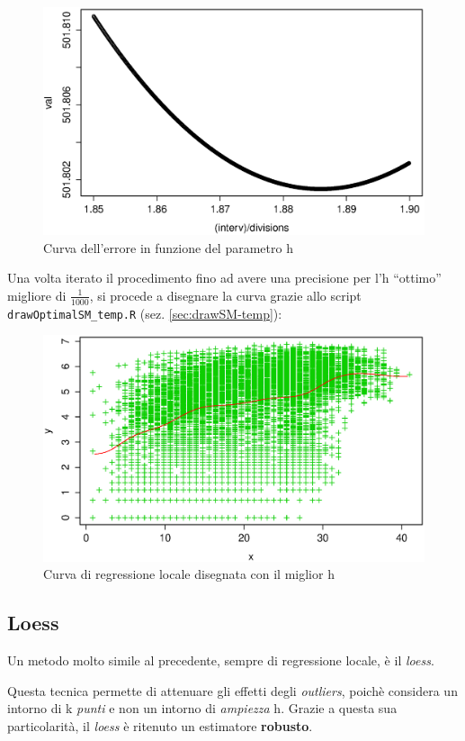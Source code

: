 \begin{figure}[H]
  \centering
  \includegraphics[width=.7\columnwidth]{images/non-linear/sm-optimal-h.eps}
  \caption{Curva dell'errore in funzione del parametro h}
  \label{fig:sm-optimal-h}
\end{figure}

Una volta iterato il procedimento fino ad avere una precisione per l'h
``ottimo'' migliore di $ \frac{1}{1000} $, si procede a disegnare la curva
grazie allo script \texttt{drawOptimalSM\_temp.R} (sez. \ref{sec:drawSM-temp}):

\begin{figure}[H]
  \centering
  \includegraphics[width=.7\columnwidth]{images/non-linear/sm-draw.eps}
  \caption{Curva di regressione locale disegnata con il miglior h}
  \label{fig:sm-draw}
\end{figure}

\subsection{Loess}\label{sec:loess}
Un metodo molto simile al precedente, sempre di regressione locale, è il
\emph{loess}.

Questa tecnica permette di attenuare gli effetti degli \emph{outliers}, poichè
considera un intorno di k \emph{punti} e non un intorno di \emph{ampiezza} h.
Grazie a questa sua particolarità, il \emph{loess} è ritenuto un estimatore
\textbf{robusto}.

